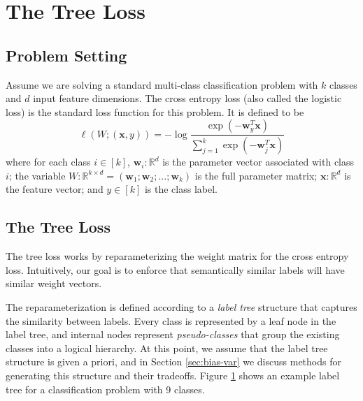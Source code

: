 \documentclass[twoside]{article}
\theoremstyle{definition}
\newcommand{\R}{\mathbb R}
\newcommand{\trans}[1]{{#1}^{T}}
\newcommand{\w}{\mathbf w}
\newcommand{\x}{\mathbf x}
\newcommand{\fixme}[1]{\noindent{\color{red}\textbf{FIXME:}  {#1}}}
\begin{document}
\section{The Tree Loss}

\subsection{Problem Setting}

Assume we are solving a standard multi-class classification problem with $k$ classes and $d$ input feature dimensions.
The cross entropy loss (also called the logistic loss) is the standard loss function for this problem.
It is defined to be
\begin{equation}
    \label{eq:xentropy}
    \ell(W;(\x,y)) = - \log \frac {\exp(-\trans\w_y \x)}{\sum_{j=1}^k \exp(-\trans \w_j \x)}
\end{equation}
where for each class $i\in[k]$,
$\w_i : \R^d$ is the parameter vector associated with class $i$;
the variable $W : \R^{k \times d} = (\w_1; \w_2; ...; \w_k)$ is the full parameter matrix;
$\x : \R^d$ is the feature vector;
and $y \in [k]$ is the class label.

\subsection{The Tree Loss}

The tree loss works by reparameterizing the weight matrix for the cross entropy loss.
Intuitively, our goal is to enforce that semantically similar labels will have similar weight vectors.

The reparameterization is defined according to a \emph{label tree} structure that captures the similarity between labels.
Every class is represented by a leaf node in the label tree,
and internal nodes represent \emph{pseudo-classes} that group the existing classes into a logical hierarchy.
At this point, we assume that the label tree structure is given a priori, and in Section \ref{sec:bias-var} we discuss methods for generating this structure and their tradeoffs.
Figure \ref{fig:labeltree} shows an example label tree for a classification problem with 9 classes.

\begin{figure}
    \caption{\fixme{caption}}
    \label{fig:labeltree}
\end{figure}
\end{document}
